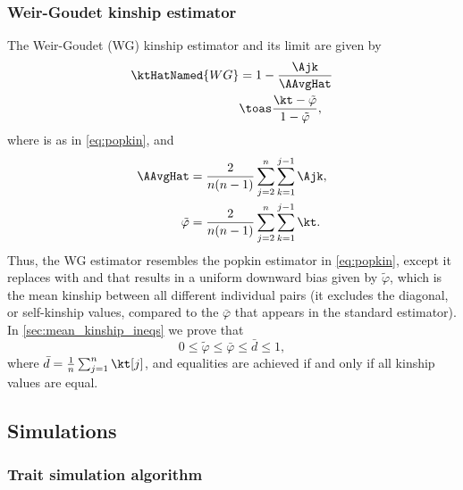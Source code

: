\documentclass[11pt]{article}
\begin{document}
\subsubsection{Weir-Goudet kinship estimator}

The Weir-Goudet (WG) kinship estimator and its limit are given by \citep{weir_unified_2017, ochoa_estimating_2021}
\begin{align}
  \label{eq:wg}
  \ktHatNamed{WG}
  &=
    1 - \frac{\Ajk}{\AAvgHat}
  \\
  \label{eq:wg_lim}
  &\toas
    \frac{ \kt - \tilde{\varphi} }{ 1 - \tilde{\varphi} }
    ,
\end{align}
where \Ajk is as in \cref{eq:popkin}, and
\begin{equation}
  \label{eq:wg_tilde}
  \begin{split}
    \AAvgHat
    &=
    \frac{2}{n(n-1)}
    \sum_{j=2}^n
    \sum_{k=1}^{j-1}
    \Ajk
    ,\\
    \tilde{\varphi}
    &=
    \frac{2}{n(n-1)}
    \sum_{j=2}^n
    \sum_{k=1}^{j-1}
    \kt
    .
  \end{split}
\end{equation}
Thus, the WG estimator resembles the popkin estimator in \cref{eq:popkin}, except it replaces \AMinHat with \AAvgHat and that results in a uniform downward bias given by $\tilde{\varphi}$, which is the mean kinship between all different individual pairs (it excludes the diagonal, or self-kinship values, compared to the $\bar{\varphi}$ that appears in the standard estimator).
In \cref{sec:mean_kinship_ineqs} we prove that
$$
0 \le \tilde{\varphi} \le \bar{\varphi} \le \bar{d} \le 1,
$$
where $\bar{d} = \frac{1}{n} \sum_{j=1}^n \kt[j]$, and equalities are achieved if and only if all kinship values are equal.

\subsection{Simulations}

\subsubsection{Trait simulation algorithm}
\end{document}
